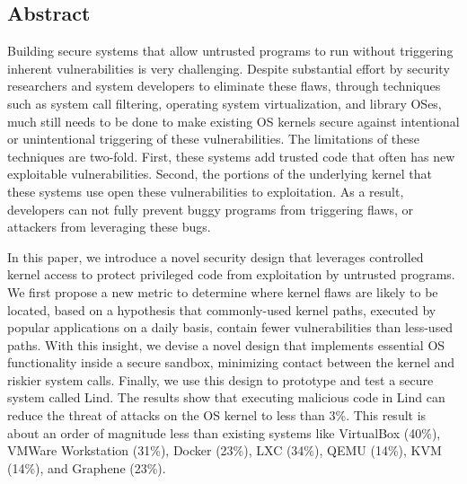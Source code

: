 \subsection*{Abstract}
Building secure systems that allow untrusted programs to run without
triggering inherent vulnerabilities %
is very challenging. 
Despite substantial effort by security researchers and system developers to
eliminate these flaws, through techniques such as system call filtering,
operating system virtualization, and library OSes, much still needs to be done
to make existing OS kernels secure against intentional or unintentional
triggering of these vulnerabilities.
The limitations of these techniques are two-fold.
First, these systems add trusted code that often has new
exploitable vulnerabilities. Second, the portions of the underlying kernel
that these systems use open these vulnerabilities to exploitation.
As a result, developers can not fully prevent buggy programs from triggering
flaws, or attackers from leveraging these bugs.

In this paper, we introduce a novel security design that leverages
controlled kernel access to protect privileged code from exploitation by
untrusted programs.
We first propose a new metric to determine where kernel flaws are
likely to be located, based on a hypothesis that commonly-used kernel
paths, executed by popular applications on a daily basis, contain fewer
vulnerabilities than less-used paths. With this insight, we devise a
novel design that implements essential OS functionality inside a
secure sandbox, minimizing contact between the kernel and riskier system calls.
Finally, we use this design to prototype and test a secure system called Lind.
The results show that executing malicious code in Lind can reduce the threat of
attacks on the OS kernel to less than 3\%.
This result is about an order of magnitude less than existing systems like VirtualBox (40\%),
VMWare Workstation (31\%), Docker (23\%), LXC (34\%), QEMU (14\%), KVM (14\%), and Graphene (23\%).